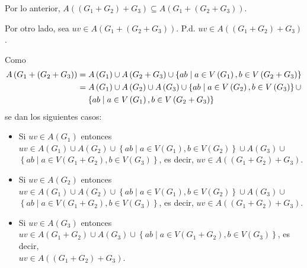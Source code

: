 \documentclass[fleqn]{article}
\begin{document}
\begin{enumerate}[a)]
        Por lo anterior, $ A \left( \left( G_1 + G_2 \right) + G_3 \right) \subseteq A \left( G_1 + \left( G_2 + G_3 \right) \right) $.

        Por otro lado, sea $ uv \in A \left( G_1 + \left( G_2 + G_3 \right) \right) $. P.d. $ uv \in A \left( \left( G_1 + G_2 \right) + G_3 \right) $.
        
        Como
        \begin{align*}
            A \left( G_1 + \left( G_2 + G_3 \right) \right) &= A \left( G_1 \right) \cup A \left( G_2 + G_3 \right) \cup \left\lbrace ab \mid a \in V \left( G_1 \right), b \in V \left( G_2 + G_3 \right) \right\rbrace \\
            &= A \left( G_1 \right) \cup A \left( G_2 \right) \cup A \left( G_3 \right) \cup \left\lbrace ab \mid a \in V \left( G_2 \right), b \in V \left( G_3 \right) \right\rbrace \cup \\
            & \hspace{4mm} \left\lbrace ab \mid a \in V \left( G_1 \right), b \in V \left( G_2 + G_3 \right) \right\rbrace
        \end{align*}
        se dan los siguientes casos:

        \begin{itemize}
            \item Si $ uv \in A \left( G_1 \right) $ entonces $ uv \in A \left( G_1 \right) \cup A \left( G_2 \right) \cup \left\lbrace ab \mid a \in V \left( G_1 \right), b \in V \left( G_2 \right) \right\rbrace \cup A \left( G_3 \right) \cup $ \\ $ \left\lbrace ab \mid a \in V \left( G_1 + G_2 \right), b \in V \left( G_3 \right) \right\rbrace $, es decir, $ uv \in A \left( \left( G_1 + G_2 \right) + G_3 \right) $.
            
            \item Si $ uv \in A \left( G_2 \right) $ entonces $ uv \in A \left( G_1 \right) \cup A \left( G_2 \right) \cup \left\lbrace ab \mid a \in V \left( G_1 \right), b \in V \left( G_2 \right) \right\rbrace \cup A \left( G_3 \right) \cup $ \\ $ \left\lbrace ab \mid a \in V \left( G_1 + G_2 \right), b \in V \left( G_3 \right) \right\rbrace $, es decir, $ uv \in A \left( \left( G_1 + G_2 \right) + G_3 \right) $.
            
            \item Si $ uv \in A \left( G_3 \right) $ entonces $ uv \in A \left( G_1 + G_2 \right) \cup A \left( G_3 \right) \cup \left\lbrace ab \mid a \in V \left( G_1 + G_2 \right), b \in V \left( G_3 \right) \right\rbrace $, es decir, \\ $ uv \in A \left( \left( G_1 + G_2 \right) + G_3 \right) $.
            

\end{itemize}
\end{enumerate}
\end{document}
